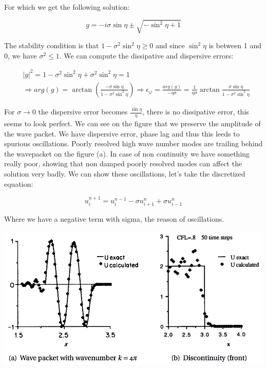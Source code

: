 For which we get the following solution:

\begin{equation}
g = - i \sigma \sin \eta \pm \sqrt{-\sin ^2 \eta + 1}
\end{equation}

The stability condition is that $1 - \sigma ^2 \sin ^2 \eta \geq 0$ and since $\sin ^2\eta$ is between 1 and 0, we have $\sigma ^2 \leq 1$. We can compute the dissipative and dispersive errors: 

\begin{equation}
\begin{aligned}
&|g|^2 = 1 - \sigma ^2 \sin ^2 \eta + \sigma ^2\sin ^2 \eta = 1 \\
&\Rightarrow arg(g) = \arctan \left(\frac{-\sigma \sin \eta }{1 - \sigma ^2 \sin ^2 \eta} \right) \Rightarrow \epsilon _\varphi = \frac{arg(g)}{-\eta \sigma } = \frac{1}{\eta \sigma } \arctan \frac{\sigma \sin \eta}{1 - \sigma ^2 \sin ^2 \eta}
\end{aligned}
\end{equation}

For $\sigma \rightarrow 0$ the dispersive error becomes $\frac{\sin \eta }{\eta}$, there is no dissipative error, this seems to look perfect. We can see on the figure that we preserve the amplitude of the wave packet. We have dispersive error, phase lag and thus this leeds to spurious oscillations. Poorly resolved high wave number modes are trailing behind the wavepacket on the figure (a). In case of non continuity we have something really poor, showing that non damped poorly resolved modes can affect the solution very badly. We can show these oscillations, let's take the discretized equation: 

\begin{equation}
u^{n+1}_i = u^{n-1}_i - \sigma u_{i+1}^n + \sigma u_{i-1}^n
\end{equation}

Where we have a negative term with sigma, the reason of oscillations. 

\begin{center}
\includegraphics[scale=0.5]{ch3/11}
\end{center}

